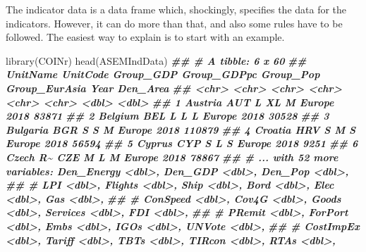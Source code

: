 \documentclass[
]{book}
\newenvironment{Shaded}{\begin{snugshade}}{\end{snugshade}}
\newcommand{\DocumentationTok}[1]{\textcolor[rgb]{0.56,0.35,0.01}{\textbf{\textit{#1}}}}
\newcommand{\FunctionTok}[1]{\textcolor[rgb]{0.00,0.00,0.00}{#1}}
\newcommand{\NormalTok}[1]{#1}
\begin{document}
The indicator data is a data frame which, shockingly, specifies the data for the indicators. However, it can do more than that, and also some rules have to be followed. The easiest way to explain is to start with an example.

\begin{Shaded}
\begin{Highlighting}[]
\FunctionTok{library}\NormalTok{(COINr)}
\FunctionTok{head}\NormalTok{(ASEMIndData)}
\DocumentationTok{\#\# \# A tibble: 6 x 60}
\DocumentationTok{\#\#   UnitName UnitCode Group\_GDP Group\_GDPpc Group\_Pop Group\_EurAsia  Year Den\_Area}
\DocumentationTok{\#\#   \textless{}chr\textgreater{}    \textless{}chr\textgreater{}    \textless{}chr\textgreater{}     \textless{}chr\textgreater{}       \textless{}chr\textgreater{}     \textless{}chr\textgreater{}         \textless{}dbl\textgreater{}    \textless{}dbl\textgreater{}}
\DocumentationTok{\#\# 1 Austria  AUT      L         XL          M         Europe         2018    83871}
\DocumentationTok{\#\# 2 Belgium  BEL      L         L           L         Europe         2018    30528}
\DocumentationTok{\#\# 3 Bulgaria BGR      S         S           M         Europe         2018   110879}
\DocumentationTok{\#\# 4 Croatia  HRV      S         M           S         Europe         2018    56594}
\DocumentationTok{\#\# 5 Cyprus   CYP      S         L           S         Europe         2018     9251}
\DocumentationTok{\#\# 6 Czech R\textasciitilde{} CZE      M         L           M         Europe         2018    78867}
\DocumentationTok{\#\# \# ... with 52 more variables: Den\_Energy \textless{}dbl\textgreater{}, Den\_GDP \textless{}dbl\textgreater{}, Den\_Pop \textless{}dbl\textgreater{},}
\DocumentationTok{\#\# \#   LPI \textless{}dbl\textgreater{}, Flights \textless{}dbl\textgreater{}, Ship \textless{}dbl\textgreater{}, Bord \textless{}dbl\textgreater{}, Elec \textless{}dbl\textgreater{}, Gas \textless{}dbl\textgreater{},}
\DocumentationTok{\#\# \#   ConSpeed \textless{}dbl\textgreater{}, Cov4G \textless{}dbl\textgreater{}, Goods \textless{}dbl\textgreater{}, Services \textless{}dbl\textgreater{}, FDI \textless{}dbl\textgreater{},}
\DocumentationTok{\#\# \#   PRemit \textless{}dbl\textgreater{}, ForPort \textless{}dbl\textgreater{}, Embs \textless{}dbl\textgreater{}, IGOs \textless{}dbl\textgreater{}, UNVote \textless{}dbl\textgreater{},}
\DocumentationTok{\#\# \#   CostImpEx \textless{}dbl\textgreater{}, Tariff \textless{}dbl\textgreater{}, TBTs \textless{}dbl\textgreater{}, TIRcon \textless{}dbl\textgreater{}, RTAs \textless{}dbl\textgreater{},}

\end{Highlighting}
\end{Shaded}
\end{document}
